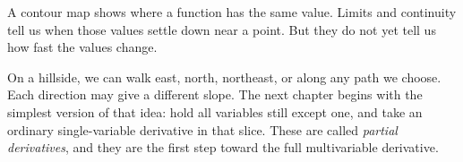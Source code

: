 A contour map shows where a function has the same value.  Limits and continuity tell
us when those values settle down near a point.  But they do not yet tell us how fast the
values change.

On a hillside, we can walk east, north, northeast, or along any path we choose.  Each
direction may give a different slope.  The next chapter begins with the simplest version
of that idea: hold all variables still except one, and take an ordinary single-variable
derivative in that slice.  These are called \emph{partial derivatives}, and they are the
first step toward the full multivariable derivative.

